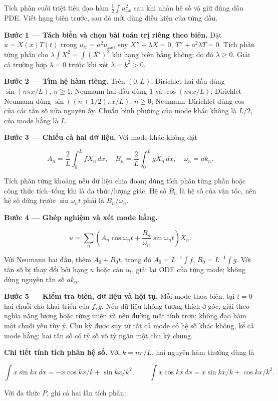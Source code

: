 \documentclass[10pt,a4paper]{article}
\begin{document}
Tích phân cuối triệt tiêu đạo hàm $\frac12\int u_{xx}^2$ sau khi nhân hệ số và giữ đúng dấu PDE. Viết hạng biên trước, sau đó mới dùng điều kiện của từng đầu.

\textbf{Bước 1 — Tách biến và chọn bài toán trị riêng theo biên.} Đặt $u=X(x)T(t)$ trong $u_{tt}=a^2u_{xx}$, suy $X''+\lambda X=0$, $T''+a^2\lambda T=0$. Tích phân từng phần cho $\lambda\int X^2=\int (X')^2$ khi hạng biên bằng không; do đó $\lambda\ge0$. Giải cả trường hợp $\lambda=0$ trước khi xét $\lambda=k^2>0$.

\textbf{Bước 2 — Tìm hệ hàm riêng.} Trên $(0,L)$: Dirichlet hai đầu dùng $\sin(n\pi x/L)$, $n\ge1$; Neumann hai đầu dùng $1$ và $\cos(n\pi x/L)$; Dirichlet–Neumann dùng $\sin((n+1/2)\pi x/L)$, $n\ge0$; Neumann–Dirichlet dùng cos của các tần số nửa nguyên ấy. Chuẩn bình phương của mode khác không là $L/2$, của mode hằng là $L$.

\textbf{Bước 3 — Chiếu cả hai dữ liệu.} Với mode khác không đặt


\[
A_n=\frac2L\int_0^L fX_n\,dx,\quad B_n=\frac2L\int_0^L gX_n\,dx,\quad \omega_n=ak_n.
\]


Tích phân từng khoảng nếu dữ liệu chia đoạn; dùng tích phân từng phần hoặc công thức tích–tổng khi là đa thức/lượng giác. Hệ số $B_n$ là hệ số của vận tốc, nên hệ số đứng trước $\sin\omega_nt$ phải là $B_n/\omega_n$.

\textbf{Bước 4 — Ghép nghiệm và xét mode hằng.}


\[
u=\sum_n\left(A_n\cos\omega_nt+\frac{B_n}{\omega_n}\sin\omega_nt\right)X_n.
\]


Với Neumann hai đầu, thêm $A_0+B_0t$, trong đó $A_0=L^{-1}\int f$, $B_0=L^{-1}\int g$. Với tần số bị thay đổi bởi hạng $u$ hoặc cản $u_t$, giải lại ODE của từng mode; không dùng nguyên tần số $ak_n$.

\textbf{Bước 5 — Kiểm tra biên, dữ liệu và hội tụ.} Mỗi mode thỏa biên; tại $t=0$ hai chuỗi cho khai triển của $f,g$. Nếu dữ liệu không tương thích ở góc, giải theo nghĩa năng lượng hoặc từng miền và nêu đường mất tính trơn; không đạo hàm một chuỗi yếu tùy ý. Chu kỳ được suy từ tất cả mode có hệ số khác không, kể cả mode hằng; hai tần số có tỷ số vô tỷ ngăn một chu kỳ chung.

\textbf{Chi tiết tính tích phân hệ số.} Với $k=n\pi/L$, hai nguyên hàm thường dùng là


\[
\int x\sin kx\,dx=-x\cos kx/k+\sin kx/k^2,\qquad
\int x\cos kx\,dx=x\sin kx/k+\cos kx/k^2.
\]


Với đa thức $P$, ghi cả hai lần tích phân:
\end{document}
